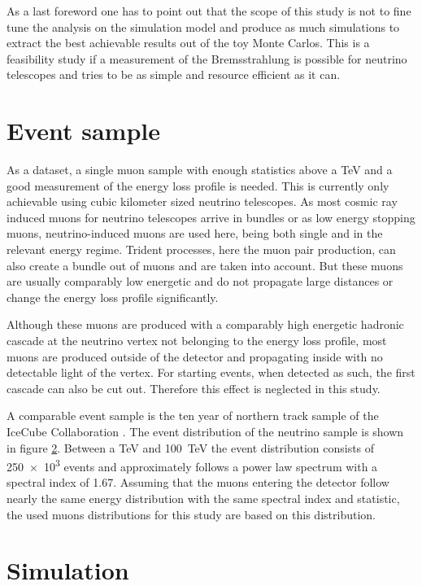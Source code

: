 As a last foreword one has to point out that the scope of this study is not to fine tune the analysis on the simulation model and produce as much simulations to extract the best achievable results out of the toy Monte Carlos.
This is a feasibility study if a measurement of the Bremsstrahlung is possible for neutrino telescopes and tries to be as simple and resource efficient as it can.

\section{Event sample}

As a dataset, a single muon sample with enough statistics above a TeV and a good measurement of the energy loss profile is needed.
This is currently only achievable using cubic kilometer sized neutrino telescopes.
As most cosmic ray induced muons for neutrino telescopes arrive in bundles or as low energy stopping muons, neutrino-induced muons are used here, being both single and in the relevant energy regime.
Trident processes, here the muon pair production, can also create a bundle out of muons and are taken into account.
But these muons are usually comparably low energetic and do not propagate large distances or change the energy loss profile significantly.

Although these muons are produced with a comparably high energetic hadronic cascade at the neutrino vertex not belonging to the energy loss profile, most muons are produced outside of the detector and propagating inside with no detectable light of the vertex.
For starting events, when detected as such, the first cascade can also be cut out.
Therefore this effect is neglected in this study.

A comparable event sample is the ten year of northern track sample of the IceCube Collaboration \cite{ic_tracks_icrc}.
The event distribution of the neutrino sample is shown in figure \ref{}.
Between a TeV and \SI{100}{TeV} the event distribution consists of \num{250e3} events and approximately follows a power law spectrum with a spectral index of \num{1.67}.
Assuming that the muons entering the detector follow nearly the same energy distribution with the same spectral index and statistic, the used muons distributions for this study are based on this distribution.

\section{Simulation}

